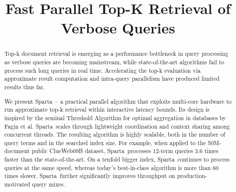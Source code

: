 \documentclass[sigconf]{acmart}
\begin{document}
\newcommand{\alg}{Sparta}  
\newcommand{\inred}[1]{{\color{red}{#1}}}
\newcommand{\inblue}[1]{{\color{blue}{#1}}}
\newcommand{\remove}[1]{}


\title{Fast Parallel Top-K Retrieval of Verbose Queries}


\author{ }




\begin{abstract}
Top-k document retrieval is emerging as a performance bottleneck in query processing as verbose queries are becoming 
mainstream, while state-of-the-art algorithms fail to process such long queries in real time. Accelerating the top-k evaluation 
via approximate result computation and intra-query parallelism have produced limited results thus far. 

We present \alg\ -- a practical parallel algorithm that exploits multi-core hardware to run approximate top-k retrieval 
within interactive latency bounds. Its design is inspired by the seminal Threshold Algorithm for optimal aggregation in databases 
by Fagin et al. \alg\ scales through lightweight coordination and context sharing among concurrent threads. The resulting algorithm 
is highly scalable, 
both in the number of query terms and in the searched index size. For example, when applied to the 50M-document public ClueWeb09B 
dataset, \alg\  processes $12$-term queries $3.6$ times faster than the state-of-the-art. On a tenfold  bigger index, 
\alg\ continues to process queries at the same speed, whereas today's best-in-class algorithm is more than 60 times slower. 
\alg\ further significantly improves throughput on production-motivated query mixes. 
\end{abstract}

\maketitle











  
\end{document}
